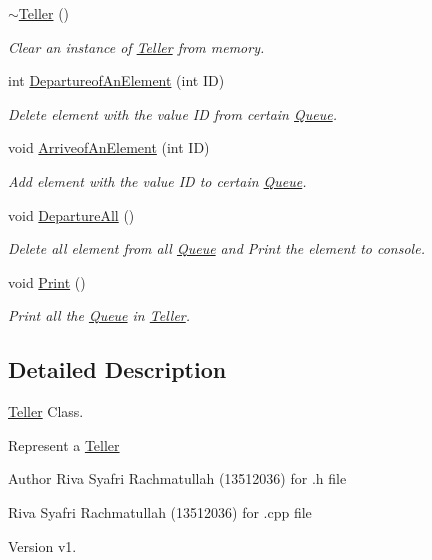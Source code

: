 \begin{DoxyCompactItemize}
\hyperlink{class_teller_af61263c98d7ff236ca84ec551919d7e7}{$\sim$\-Teller} ()
\begin{DoxyCompactList}\small\item\em Clear an instance of \hyperlink{class_teller}{Teller} from memory. \end{DoxyCompactList}\item 
int \hyperlink{class_teller_a53829996d557a0bdf9513366461d7986}{Departureof\-An\-Element} (int I\-D)
\begin{DoxyCompactList}\small\item\em Delete element with the value I\-D from certain \hyperlink{class_queue}{Queue}. \end{DoxyCompactList}\item 
void \hyperlink{class_teller_ae5db2a5bde036fa0e0ff27f257cdea27}{Arriveof\-An\-Element} (int I\-D)
\begin{DoxyCompactList}\small\item\em Add element with the value I\-D to certain \hyperlink{class_queue}{Queue}. \end{DoxyCompactList}\item 
void \hyperlink{class_teller_a22b0dcc673d701ec82f88fa0cf58900a}{Departure\-All} ()
\begin{DoxyCompactList}\small\item\em Delete all element from all \hyperlink{class_queue}{Queue} and Print the element to console. \end{DoxyCompactList}\item 
void \hyperlink{class_teller_a85b5bfcdab1ad0f595f544bda26dea1e}{Print} ()
\begin{DoxyCompactList}\small\item\em Print all the \hyperlink{class_queue}{Queue} in \hyperlink{class_teller}{Teller}. \end{DoxyCompactList}\end{DoxyCompactItemize}


\subsection{Detailed Description}
\hyperlink{class_teller}{Teller} Class. 

Represent a \hyperlink{class_teller}{Teller}

\begin{DoxyAuthor}{Author}
Riva Syafri Rachmatullah (13512036) for .h file 

Riva Syafri Rachmatullah (13512036) for .cpp file
\end{DoxyAuthor}
\begin{DoxyVersion}{Version}
v1. 
\end{DoxyVersion}


